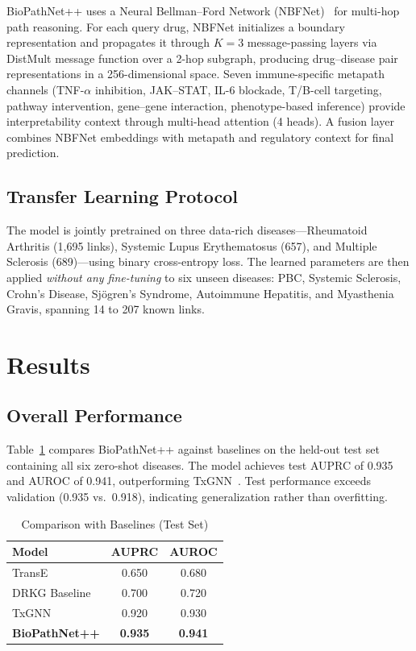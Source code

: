 \documentclass[conference]{IEEEtran}
\begin{document}
BioPathNet++ uses a Neural Bellman--Ford Network (NBFNet)~\cite{nbfnet} for multi-hop path reasoning. For each query drug, NBFNet initializes a boundary representation and propagates it through $K{=}3$ message-passing layers via DistMult message function over a 2-hop subgraph, producing drug--disease pair representations in a 256-dimensional space. Seven immune-specific metapath channels (TNF-$\alpha$ inhibition, JAK--STAT, IL-6 blockade, T/B-cell targeting, pathway intervention, gene--gene interaction, phenotype-based inference) provide interpretability context through multi-head attention (4 heads). A fusion layer combines NBFNet embeddings with metapath and regulatory context for final prediction.

\subsection{Transfer Learning Protocol}

The model is jointly pretrained on three data-rich diseases---Rheumatoid Arthritis (1,695 links), Systemic Lupus Erythematosus (657), and Multiple Sclerosis (689)---using binary cross-entropy loss. The learned parameters are then applied \textit{without any fine-tuning} to six unseen diseases: PBC, Systemic Sclerosis, Crohn's Disease, Sj\"{o}gren's Syndrome, Autoimmune Hepatitis, and Myasthenia Gravis, spanning 14 to 207 known links.

\section{Results}

\subsection{Overall Performance}

Table~\ref{tab:overall} compares BioPathNet++ against baselines on the held-out test set containing all six zero-shot diseases. The model achieves test AUPRC of 0.935 and AUROC of 0.941, outperforming TxGNN~\cite{txgnn}. Test performance exceeds validation (0.935 vs.\ 0.918), indicating generalization rather than overfitting.

\begin{table}[!t]
\caption{Comparison with Baselines (Test Set)}
\label{tab:overall}
\centering
\footnotesize
\renewcommand{\arraystretch}{1.3}
\begin{tabular}{lcc}
\toprule
\textbf{Model} & \textbf{AUPRC} & \textbf{AUROC} \\
\midrule
TransE & 0.650 & 0.680 \\
DRKG Baseline & 0.700 & 0.720 \\
TxGNN~\cite{txgnn} & 0.920 & 0.930 \\
\textbf{BioPathNet++} & \textbf{0.935} & \textbf{0.941} \\
\bottomrule
\end{tabular}
\end{table}
\end{document}
